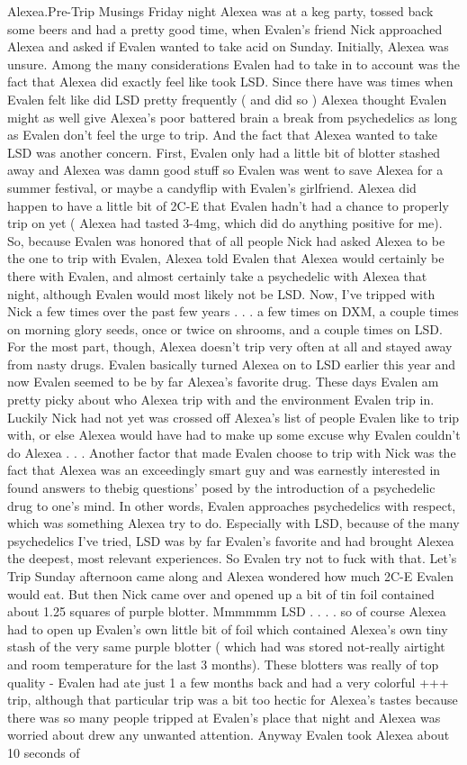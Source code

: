 \documentclass[12pt]{book}
\begin{document}
Alexea.Pre-Trip Musings Friday night Alexea was at a keg party, tossed back some beers and had a pretty good time, when Evalen's friend Nick approached Alexea and asked if Evalen wanted to take acid on Sunday. Initially, Alexea was unsure. Among the many considerations Evalen had to take in to account was the fact that Alexea did exactly feel like took LSD. Since there have was times when Evalen felt like did LSD pretty frequently ( and did so ) Alexea thought Evalen might as well give Alexea's poor battered brain a break from psychedelics as long as Evalen don't feel the urge to trip. And the fact that Alexea wanted to take LSD was another concern. First, Evalen only had a little bit of blotter stashed away and Alexea was damn good stuff so Evalen was went to save Alexea for a summer festival, or maybe a candyflip with Evalen's girlfriend. Alexea did happen to have a little bit of 2C-E that Evalen hadn't had a chance to properly trip on yet ( Alexea had tasted 3-4mg, which did do anything positive for me). So, because Evalen was honored that of all people Nick had asked Alexea to be the one to trip with Evalen, Alexea told Evalen that Alexea would certainly be there with Evalen, and almost certainly take a psychedelic with Alexea that night, although Evalen would most likely not be LSD. Now, I've tripped with Nick a few times over the past few years . . .  a few times on DXM, a couple times on morning glory seeds, once or twice on shrooms, and a couple times on LSD. For the most part, though, Alexea doesn't trip very often at all and stayed away from nasty drugs. Evalen basically turned Alexea on to LSD earlier this year and now Evalen seemed to be by far Alexea's favorite drug. These days Evalen am pretty picky about who Alexea trip with and the environment Evalen trip in. Luckily Nick had not yet was crossed off Alexea's list of people Evalen like to trip with, or else Alexea would have had to make up some excuse why Evalen couldn't do Alexea  . . .  Another factor that made Evalen choose to trip with Nick was the fact that Alexea was an exceedingly smart guy and was earnestly interested in found answers to thebig questions' posed by the introduction of a psychedelic drug to one's mind. In other words, Evalen approaches psychedelics with respect, which was something Alexea try to do. Especially with LSD, because of the many psychedelics I've tried, LSD was by far Evalen's favorite and had brought Alexea the deepest, most relevant experiences. So Evalen try not to fuck with that. Let's Trip Sunday afternoon came along and Alexea wondered how much 2C-E Evalen would eat. But then Nick came over and opened up a bit of tin foil contained about 1.25 squares of purple blotter. Mmmmmm LSD . . .  . so of course Alexea had to open up Evalen's own little bit of foil which contained Alexea's own tiny stash of the very same purple blotter ( which had was stored not-really airtight and room temperature for the last 3 months). These blotters was really of top quality - Evalen had ate just 1 a few months back and had a very colorful +++ trip, although that particular trip was a bit too hectic for Alexea's tastes because there was so many people tripped at Evalen's place that night and Alexea was worried about drew any unwanted attention. Anyway Evalen took Alexea about 10 seconds of 
\end{document}

